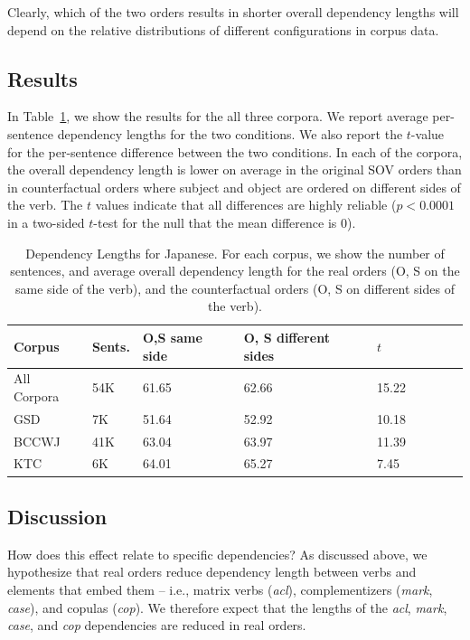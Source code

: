 \documentclass[11pt,a4paper]{article}
\begin{document}
Clearly, which of the two orders results in shorter overall dependency lengths will depend on the relative distributions of different configurations in corpus data.

\subsection{Results}
In Table~\ref{tab:depl-resu}, we show the results for the all three corpora.
We report average per-sentence dependency lengths for the two conditions.
We also report the $t$-value for the per-sentence difference between the two conditions.
In each of the corpora, the overall dependency length is lower on average in the original SOV orders than in counterfactual orders where subject and object are ordered on different sides of the verb.
The $t$ values indicate that all differences are highly reliable ($p < 0.0001$ in a two-sided $t$-test for the null that the mean difference is $0$).


\begin{table}
\begin{center}
\begin{tabular}{l|l|lllllll}
 Corpus                   &   Sents.                     & O,S same side   & O, S different sides  & $t$   \\ \hline\hline
All Corpora     &  54K     & 61.65 & 62.66 &   15.22   \\ \hline
GSD             &   7K       & 51.64 &  52.92  &  10.18  \\
BCCWJ           &   41K       &    63.04   & 63.97 &  11.39  \\
KTC             &   6K   &  64.01 & 65.27 &  7.45\\ \hline
\end{tabular}
\end{center}
\caption{Dependency Lengths for Japanese. For each corpus, we show the number of sentences, and average overall dependency length for the real orders (O, S on the same side of the verb), and the counterfactual orders (O, S on different sides of the verb).}\label{tab:depl-resu}
\end{table}



\subsection{Discussion}
How does this effect relate to specific dependencies?
As discussed above, we hypothesize that real orders reduce dependency length between verbs and elements that embed them -- i.e., matrix verbs (\emph{acl}), complementizers (\emph{mark}, \emph{case}), and copulas (\emph{cop}).
We therefore expect that the lengths of the \emph{acl}, \emph{mark}, \emph{case}, and \emph{cop} dependencies are reduced in real orders.
\end{document}

